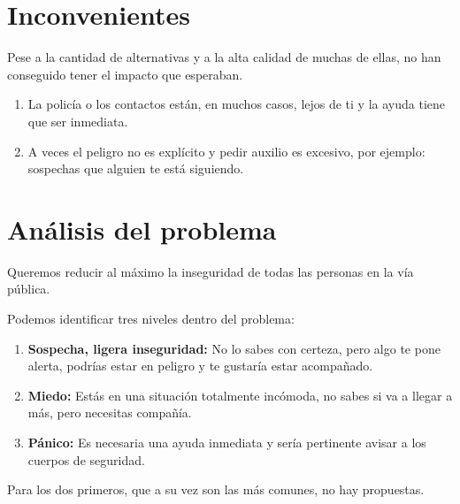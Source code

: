 \section{Inconvenientes}
Pese a la cantidad de alternativas y a la alta calidad de muchas de ellas, no han conseguido tener el impacto que esperaban.
\begin{enumerate}
  \item La policía o los contactos están, en muchos casos, lejos de ti y la ayuda tiene que ser inmediata.
  \item A veces el peligro no es explícito y pedir auxilio es excesivo, por ejemplo: sospechas que alguien te está siguiendo.
\end{enumerate}

\section{Análisis del problema}
Queremos reducir al máximo la inseguridad de todas las personas en la vía pública.

Podemos identificar tres niveles dentro del problema:
\begin{enumerate}
  \item \textbf{Sospecha, ligera inseguridad:} No lo sabes con certeza, pero algo te pone alerta, podrías estar en peligro y te gustaría estar acompañado.
  \item \textbf{Miedo:} Estás en una situación totalmente incómoda, no sabes si va a llegar a más, pero necesitas compañía.
  \item \textbf{Pánico:} Es necesaria una ayuda inmediata y sería pertinente avisar a los cuerpos de seguridad.
\end{enumerate}

Para los dos primeros, que a su vez son las más comunes, no hay propuestas.

